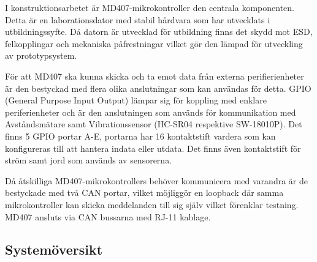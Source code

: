 \documentclass{article}
\begin{document}
I konstruktionsarbetet är MD407-mikrokontroller den centrala komponenten. Detta är en laborationsdator med stabil hårdvara som har utvecklats i utbildningssyfte. Då datorn är utvecklad för utbildning finns det skydd mot ESD, felkopplingar och mekaniska påfrestningar vilket gör den lämpad för utveckling av prototypsystem.

För att MD407 ska kunna skicka och ta emot data från externa perifierienheter är den bestyckad med flera olika anslutningar som kan användas för detta. GPIO (General Purpose Input Output) lämpar sig för koppling med enklare periferienheter och är den anslutningen som används för kommunikation med Avståndsmätare samt Vibrationssensor (HC-SR04 respektive SW-18010P). Det finns 5 GPIO portar A-E, portarna har 16 kontaktstift vardera som kan konfigureras till att hantera indata eller utdata. Det finns även kontaktstift för ström samt jord som används av sensorerna.

Då åtskilliga MD407-mikrokontrollers behöver kommunicera med varandra är de bestyckade med två CAN portar, vilket möjliggör en loopback där samma mikrokontroller kan skicka meddelanden till sig själv vilket förenklar testning. MD407 ansluts via CAN bussarna med RJ-11 kablage.



\subsection{Systemöversikt}
\end{document}
